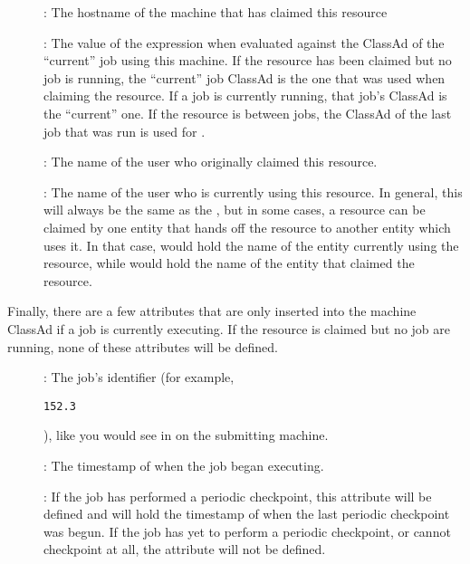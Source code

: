 \begin{description}

\item[] : The hostname of the machine that has
claimed this resource

\item[] : The value of the  expression
when evaluated against the ClassAd of the ``current'' job using this
machine.
If the resource has been claimed but no job is running, the
``current'' job ClassAd is the one that was used when claiming the
resource.
If a job is currently running, that job's ClassAd is the ``current''
one.  
If the resource is between jobs, the ClassAd of the last job that was
run is used for .

\item[] : The name of the user who originally
claimed this resource.

\item[] : The name of the user who is currently
using this resource.
In general, this will always be the same as the ,
but in some cases, a resource can be claimed by one entity that hands
off the resource to another entity which uses it.
In that case,  would hold the name of the entity
currently using the resource, while  would hold
the name of the entity that claimed the resource.

\end{description}

Finally, there are a few attributes that are only inserted into the
machine ClassAd if a job is currently executing.  
If the resource is claimed but no job are running, none of these
attributes will be defined.

\begin{description}

\item[] : The job's identifier (for example,
\begin{verbatim}152.3\end{verbatim}), like you would see in 
on the submitting machine.

\item[] : The timestamp of when the job began
executing. 

\item[] : If the job has performed a
periodic checkpoint, this attribute will be defined and will hold the
timestamp of when the last periodic checkpoint was begun.
If the job has yet to perform a periodic checkpoint, or cannot
checkpoint at all, the  attribute will
not be defined.

\end{description}

